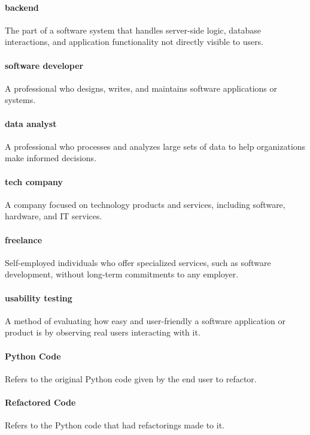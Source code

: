 \documentclass[12pt]{article}
\begin{document}
\paragraph*{backend}
The part of a software system that handles server-side logic,
database interactions, and application functionality not directly
visible to users.

\paragraph*{software developer}
A professional who designs, writes, and maintains software
applications or systems.

\paragraph*{data analyst}
A professional who processes and analyzes large sets of data to help
organizations make informed decisions.

\paragraph*{tech company}
A company focused on technology products and services, including
software, hardware, and IT services.

\paragraph*{freelance}
Self-employed individuals who offer specialized services, such as
software development, without long-term commitments to any employer.

\paragraph*{usability testing}
A method of evaluating how easy and user-friendly a software
application or product is by observing real users interacting with it.

\paragraph*{Python Code}
Refers to the original Python code given by the end user to refactor.

\paragraph*{Refactored Code}
Refers to the Python code that had refactorings made to it.
\end{document}
